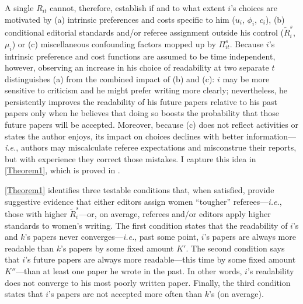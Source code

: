 A single $R_{it}$ cannot, therefore, establish if and to what extent $i$'s choices are motivated by (a) intrinsic preferences and costs specific to him ($u_i$, $\phi_i$, $c_{i}$), (b) conditional editorial standards and\slash or referee assignment outside his control ($\widetilde R_i^s$, $\mu_i$) or (c) miscellaneous confounding factors mopped up by $\Pi_{it}^s$. Because $i$'s intrinsic preference and cost functions are assumed to be time independent, however, observing an increase in his choice of readability at two separate $t$ distinguishes (a) from the combined impact of (b) and (c): $i$ may be more sensitive to criticism and he might prefer writing more clearly; nevertheless, he persistently improves the readability of his future papers relative to his past papers only when he believes that doing so boosts the probability that those future papers will be accepted. Moreover, because (c) does not reflect activities or states the author enjoys, its impact on choices declines with better information---\emph{i.e.}, authors may miscalculate referee expectations and misconstrue their reports, but with experience they correct those mistakes. I capture this idea in \autoref{Theorem1}, which is proved in .



\autoref{Theorem1} identifies three testable conditions that, when satisfied, provide suggestive evidence that either editors assign women ``tougher'' referees---\emph{i.e.}, those with higher $\widetilde R_{i}^s$---or, on average, referees and\slash or editors apply higher standards to women's writing. The first condition states that the readability of $i$'s and $k$'s papers never converges---\emph{i.e.}, past some point, $i$'s papers are always more readable than $k$'s papers by some fixed amount $K'$. The second condition says that $i$'s future papers are always more readable---this time by some fixed amount $K''$---than at least one paper he wrote in the past. In other words, $i$'s readability does not converge to his most poorly written paper. Finally, the third condition states that $i$'s papers are not accepted more often than $k$'s (on average).

